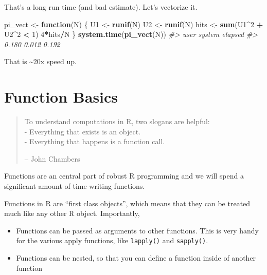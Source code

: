 \documentclass[]{book}
\newenvironment{Shaded}{\begin{snugshade}}{\end{snugshade}}
\newcommand{\CommentTok}[1]{\textcolor[rgb]{0.56,0.35,0.01}{\textit{#1}}}
\newcommand{\ControlFlowTok}[1]{\textcolor[rgb]{0.13,0.29,0.53}{\textbf{#1}}}
\newcommand{\DecValTok}[1]{\textcolor[rgb]{0.00,0.00,0.81}{#1}}
\newcommand{\KeywordTok}[1]{\textcolor[rgb]{0.13,0.29,0.53}{\textbf{#1}}}
\newcommand{\NormalTok}[1]{#1}
\newcommand{\OperatorTok}[1]{\textcolor[rgb]{0.81,0.36,0.00}{\textbf{#1}}}
\newcommand{\StringTok}[1]{\textcolor[rgb]{0.31,0.60,0.02}{#1}}
\theoremstyle{definition}
\theoremstyle{definition}
\theoremstyle{definition}
\theoremstyle{remark}
\begin{document}
That's a long run time (and bad estimate). Let's vectorize it.

\begin{Shaded}
\begin{Highlighting}[]
\NormalTok{pi_vect <-}\StringTok{ }\ControlFlowTok{function}\NormalTok{(N) \{}
\NormalTok{  U1 <-}\StringTok{ }\KeywordTok{runif}\NormalTok{(N)}
\NormalTok{  U2 <-}\StringTok{ }\KeywordTok{runif}\NormalTok{(N)}
\NormalTok{  hits <-}\StringTok{ }\KeywordTok{sum}\NormalTok{(U1}\OperatorTok{^}\DecValTok{2} \OperatorTok{+}\StringTok{ }\NormalTok{U2}\OperatorTok{^}\DecValTok{2} \OperatorTok{<}\StringTok{ }\DecValTok{1}\NormalTok{)}
  \DecValTok{4}\OperatorTok{*}\NormalTok{hits}\OperatorTok{/}\NormalTok{N}
\NormalTok{\}}
\KeywordTok{system.time}\NormalTok{(}\KeywordTok{pi_vect}\NormalTok{(N))}
\CommentTok{#>    user  system elapsed }
\CommentTok{#>   0.180   0.012   0.192}
\end{Highlighting}
\end{Shaded}

That is \textasciitilde{}20x speed up.

\hypertarget{function-basics}{%
\section{Function Basics}\label{function-basics}}

\begin{quote}
To understand computations in R, two slogans are helpful:\\
- Everything that exists is an object.\\
- Everything that happens is a function call.

-- John Chambers
\end{quote}

Functions are an central part of robust R programming and we will spend
a significant amount of time writing functions.

Functions in R are ``first class objects'', which means that they can be
treated much like any other R object. Importantly,

\begin{itemize}
\item
  Functions can be passed as arguments to other functions. This is very
  handy for the various apply functions, like \texttt{lapply()} and
  \texttt{sapply()}.
\item
  Functions can be nested, so that you can define a function inside of
  another function
\end{itemize}
\end{document}
